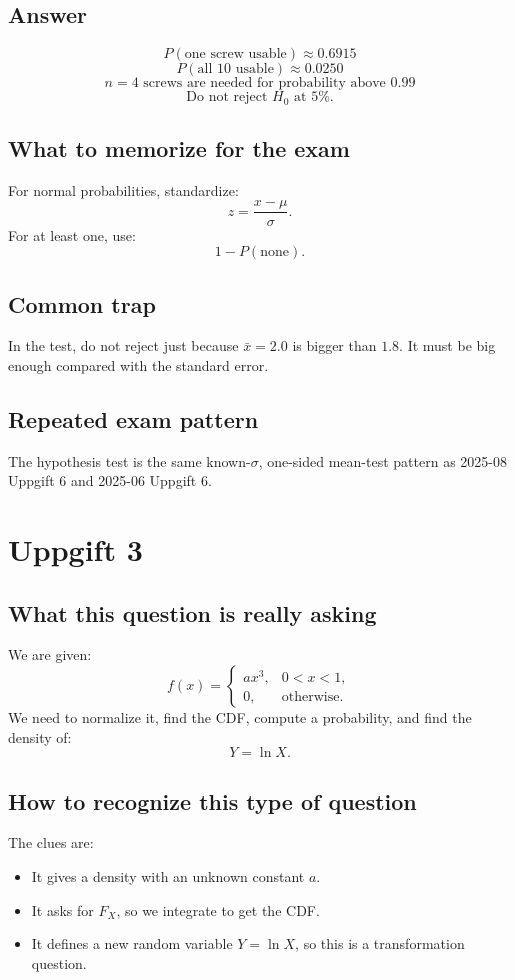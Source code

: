 \documentclass[11pt,a4paper]{article}
\begin{document}
\subsection*{Answer}
\[
\boxed{P(\text{one screw usable})\approx 0.6915}
\]
\[
\boxed{P(\text{all 10 usable})\approx 0.0250}
\]
\[
\boxed{n=4\text{ screws are needed for probability above }0.99}
\]
\[
\boxed{\text{Do not reject }H_0\text{ at 5\%.}}
\]

\subsection*{What to memorize for the exam}
For normal probabilities, standardize:
\[
z=\frac{x-\mu}{\sigma}.
\]
For at least one, use:
\[
1-P(\text{none}).
\]

\subsection*{Common trap}
In the test, do not reject just because \(\bar{x}=2.0\) is bigger than \(1.8\). It must be big enough compared with the standard error.

\subsection*{Repeated exam pattern}
The hypothesis test is the same known-\(\sigma\), one-sided mean-test pattern as 2025-08 Uppgift 6 and 2025-06 Uppgift 6.

\section*{Uppgift 3}

\subsection*{What this question is really asking}
We are given:
\[
f(x)=
\begin{cases}
ax^3, & 0<x<1,\\
0, & \text{otherwise}.
\end{cases}
\]
We need to normalize it, find the CDF, compute a probability, and find the density of:
\[
Y=\ln X.
\]

\subsection*{How to recognize this type of question}
The clues are:
\begin{itemize}[leftmargin=*]
    \item It gives a density with an unknown constant \(a\).
    \item It asks for \(F_X\), so we integrate to get the CDF.
    \item It defines a new random variable \(Y=\ln X\), so this is a transformation question.
\end{itemize}
\end{document}
